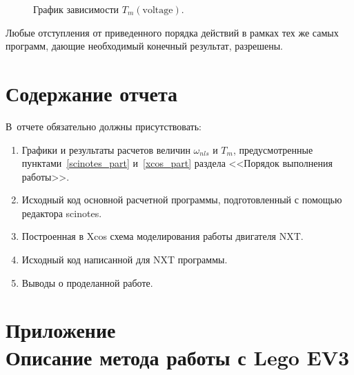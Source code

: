 \documentclass[12pt,a4paper,openany]{extarticle}
\begin{document}
\begin{enumerate}
\begin{figure}[h!]
	\label{omega_nls_power}
\end{figure}
\begin{figure}[h!]
	\noindent{}
	\caption{График зависимости $T_m(\mathrm{voltage})$.}
	\label{Tm_power}
\end{figure}
\end{enumerate}

Любые отступления от приведенного порядка действий в рамках тех же самых программ, дающие необходимый конечный результат, разрешены.
 
\newpage 
\section{Содержание отчета}
\hspace*{\parindent}В~отчете обязательно должны присутствовать:
\begin{enumerate}
\item Графики и результаты расчетов величин $\omega_{nls}$ и $T_m$, предусмотренные пунктами~\ref{scinotes_part} и~\ref{xcos_part} раздела <<Порядок выполнения работы>>.
\item Исходный код основной расчетной программы, подготовленный с помощью редактора scinotes.
\item Построенная в Xcos схема моделирования работы двигателя NXT.
\item Исходный код написанной для NXT программы.
\item Выводы о проделанной работе.
\end{enumerate}
\section{Приложение \\Описание метода работы с Lego EV3}
\end{document}
